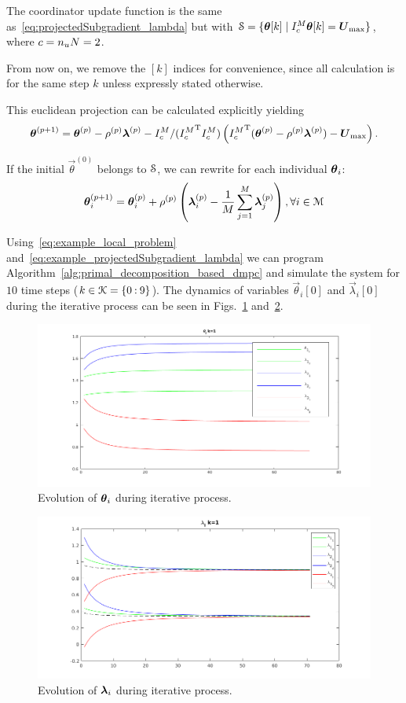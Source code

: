 \documentclass[../main.tex]{subfiles}
\begin{document}
The coordinator update function is the same as~\eqref{eq:projectedSubgradient_lambda} but with ${\mathcal{S} = \{\boldsymbol{\theta}[k]\mid I_{c}^{M}\boldsymbol{\theta}[k] = \boldsymbol{U}_{\max}\}}$, where $c=n_{u}N=2$.

From now on, we remove the $[k]$ indices for convenience, since all calculation is for the same step $k$ unless expressly stated otherwise.

This euclidean projection can be calculated explicitly yielding
\begin{equation}
    \boldsymbol{\theta}^{(p+1)}=\boldsymbol{\theta}^{(p)}-\rho^{(p)}\boldsymbol{\lambda}^{(p)}-{I_{c}^M}/({I_{c}^M}^{\mathrm{T}} {I_{c}^M})\left({I_{c}^M}^{\mathrm{T}}(\boldsymbol{\theta}^{(p)}-\rho^{(p)}\boldsymbol{\lambda}^{(p)}) -\boldsymbol{U}_{\max}\right).
\end{equation}

If the initial ${\vec{\theta}}^{(0)}$ belongs to $\mathcal{S}$, we can rewrite for each individual $\boldsymbol{\theta}_i$:
\begin{equation}
  \label{eq:example_projectedSubgradient_lambda}
 \boldsymbol{\theta}_i^{(p+1)}=\boldsymbol{\theta}_i^{(p)}+\rho^{(p)}\left(\boldsymbol{\lambda}_i^{(p)}-\frac{1}{M}\sum_{j=1}^{M}\boldsymbol{\lambda}_j^{(p)}\right),\forall i\in\mathcal{M}
\end{equation}

Using~\eqref{eq:example_local_problem} and~\eqref{eq:example_projectedSubgradient_lambda}
we can program Algorithm~\ref{alg:primal_decomposition_based_dmpc} and simulate the system for $10$ time steps (${k\in\mathcal{K}=\{0\mathbin{:}9\}}$).
The dynamics of variables $\vec{\theta}_{i}[0]$ and $\vec{\lambda}_{i}[0]$ during the iterative process can be seen in Figs.~\ref{fig:example_theta} and~\ref{fig:example_lambda}.

\begin{figure}[h]
  \centering
  \includegraphics[width=.5\textwidth]{../img/example_theta.png}
  \caption{Evolution of $\boldsymbol{\theta}_i$ during iterative process. }\label{fig:example_theta}
\end{figure}

\begin{figure}[h]
  \centering
  \includegraphics[width=.5\textwidth]{../img/example_lambda.png}
  \caption{Evolution of $\boldsymbol{\lambda}_i$ during iterative process. }\label{fig:example_lambda}
\end{figure}
\end{document}
